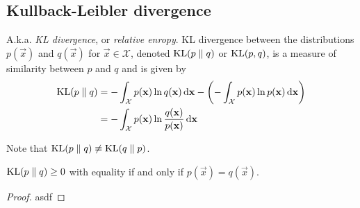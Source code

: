 \subsection{Kullback-Leibler divergence}
A.k.a. \emph{KL divergence}, or \emph{relative enropy}. KL divergence between the distributions $p(\vec x)$ and $q(\vec x)$ for $\vec x \in \mathcal X$, denoted $\operatorname{KL}(p \parallel q)$ or $\operatorname{KL}(p, q)$, is a measure of similarity between $p$ and $q$ and is given by
\begin{align}
    \operatorname{KL}(p \parallel q)  &= -\int_{\mathcal X} p(\boldsymbol{\mathbf{x}}) \ln q(\boldsymbol{\mathbf{x}}) \,\mathrm d\boldsymbol{\mathbf{x}} - \left(-\int_{\mathcal X} p(\boldsymbol{\mathbf{x}}) \ln p(\boldsymbol{\mathbf{x}}) \,\mathrm d\boldsymbol{\mathbf{x}}\right) \nonumber\\
                        &= -\int_{\mathcal X} p(\boldsymbol{\mathbf{x}}) \ln \frac{q(\boldsymbol{\mathbf{x}})}{p(\boldsymbol{\mathbf{x}})} \,\mathrm d\boldsymbol{\mathbf{x}}
\end{align}

Note that $\operatorname{KL}(p \parallel q) \not\equiv \operatorname{KL}(q \parallel p)$.

\begin{claim}
    $\operatorname{KL}(p \parallel q) \geq 0$ with equality if and only if $p(\vec x) = q(\vec x)$.
\end{claim}

\begin{proof}
    asdf
\end{proof}